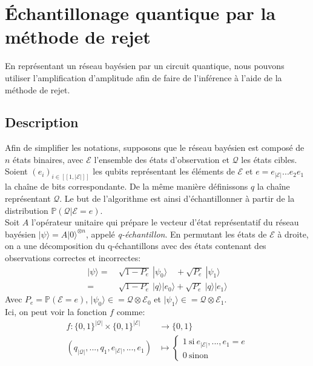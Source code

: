 \section{Échantillonage quantique par la méthode de rejet}

En représentant un réseau bayésien par un circuit quantique, nous pouvons utiliser l'amplification d'amplitude afin de faire de l'inférence à l'aide de la méthode de rejet. \cite{low2014quantum}

\subsection{Description}

Afin de simplifier les notations, supposons que le réseau bayésien est composé de $n$ états binaires, avec $\mathcal{E}$ l'ensemble des états d'observation et $\mathcal{Q}$ les états cibles.
Soient $(e_i)_{i \in [\![1,|\mathcal{E}|]\!]}$ les qubits représentant les éléments de $\mathcal{E}$ et $e = e_{|\mathcal{E}|}...e_2e_1$ la chaîne de bits correspondante. De la même manière définissons $q$ la chaîne représentant $\mathcal{Q}$.
Le but de l'algorithme est ainsi d'échantillonner à partir de la distribution $\mathbb{P}(\mathcal{Q}|\mathcal{E}=e)$.
\\
Soit $A$ l'opérateur unitaire qui prépare le vecteur d'état représentatif du réseau bayésien $| \psi \rangle = A |0\rangle ^{\otimes n}$, appelé \textit{q-échantillon}. En permutant les états de $\mathcal{E}$ à droite, on a une décomposition du q-échantillons avec des états contenant des observations correctes et incorrectes:
\begin{align*}
	|\psi \rangle =&\ \sqrt{1-P_e}\ |\psi_0\rangle \quad + \sqrt{P_e}\ |\psi_1\rangle \\
	=&\ \sqrt{1-P_e}\ |q\rangle |e_0\rangle + \sqrt{P_e}\ |q\rangle |e_1\rangle
\end{align*}
Avec $P_e = \mathbb{P}(\mathcal{E}=e)$, $|\psi_0 \rangle \in = \mathcal{Q} \otimes \mathcal{E}_0$ et $|\psi_1 \rangle \in = \mathcal{Q} \otimes \mathcal{E}_1$.
\\
Ici, on peut voir la fonction $f$ comme:
\begin{align*}
    f : \{0,1\}^{|\mathcal{Q}|}\times\{0,1\}^{|\mathcal{E}|} &\longrightarrow \{0,1\} \\
    (q_{|\mathcal{Q}|},...,q_1, e_{|\mathcal{E}|},...,e_1) &\longmapsto
 \begin{cases}
 1 \ \mathrm{si} \ e_{|\mathcal{E}|},...,e_1 = e \\
 0 \ \mathrm{sinon} \
 \end{cases}
\end{align*}
